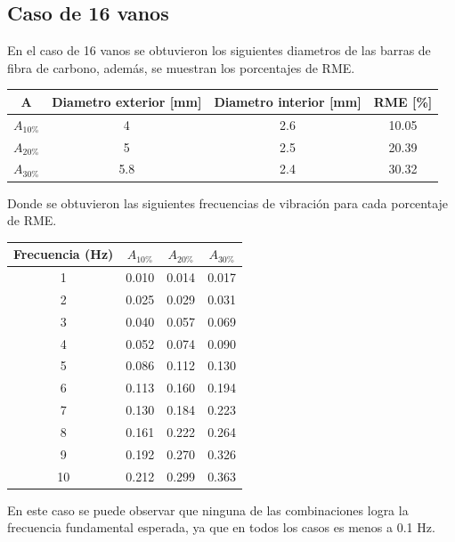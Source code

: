 \subsection{Caso de 16 vanos}
En el caso de 16 vanos se obtuvieron los siguientes diametros de las barras de fibra de carbono, además, se muestran los porcentajes de RME.

\begin{table}[H]
    \centering
    \begin{tabular}{cccc}
    \toprule
     A & Diametro exterior [mm] & Diametro interior [mm] & RME [\%] \\
    \midrule
     $A_{10\%}$ &  4 &  2.6 &  10.05 \\
     $A_{20\%}$ &  5 &  2.5 &  20.39 \\
     $A_{30\%}$ &  5.8 &  2.4 &  30.32 \\
    \bottomrule
    \end{tabular}
\end{table}

Donde se obtuvieron las siguientes frecuencias de vibración para cada porcentaje de RME.

\begin{table}[H]
    \centering
    \begin{tabular}{cccc}
    \toprule
     Frecuencia (Hz) & $A_{10\%}$ & $A_{20\%}$ & $A_{30\%}$ \\
    \midrule
     1 &       0.010 &       0.014 &       0.017 \\
     2 &       0.025 &       0.029 &       0.031 \\
     3 &       0.040 &       0.057 &       0.069 \\
     4 &       0.052 &       0.074 &       0.090 \\
     5 &       0.086 &       0.112 &       0.130 \\
     6 &       0.113 &       0.160 &       0.194 \\
     7 &       0.130 &       0.184 &       0.223 \\
     8 &       0.161 &       0.222 &       0.264 \\
     9 &       0.192 &       0.270 &       0.326 \\
     10 &       0.212 &       0.299 &       0.363 \\
    \bottomrule
    \end{tabular}
\end{table}

En este caso se puede observar que ninguna de las combinaciones logra la frecuencia fundamental esperada, ya que en todos los casos es menos a 0.1 Hz.

